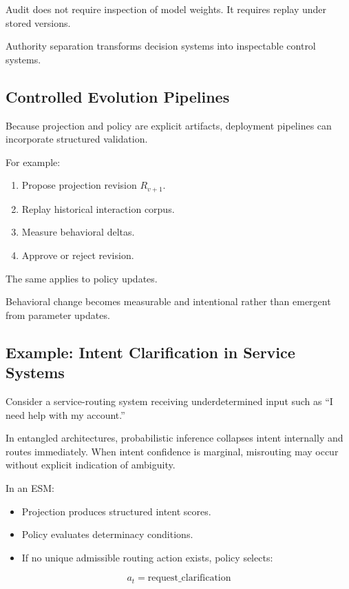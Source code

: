 \documentclass[11pt]{article}
\begin{document}
Audit does not require inspection of model weights. It requires replay under stored versions.

Authority separation transforms decision systems into inspectable control systems.


\subsection{Controlled Evolution Pipelines}

Because projection and policy are explicit artifacts, deployment pipelines can incorporate structured validation.

For example:

\begin{enumerate}
  \item Propose projection revision $R_{v+1}$.
  \item Replay historical interaction corpus.
  \item Measure behavioral deltas.
  \item Approve or reject revision.
\end{enumerate}

The same applies to policy updates.

Behavioral change becomes measurable and intentional rather than emergent from parameter updates.


\subsection{Example: Intent Clarification in Service Systems}

Consider a service-routing system receiving underdetermined input such as ``I need help with my account.''

In entangled architectures, probabilistic inference collapses intent internally and routes immediately. When intent confidence is marginal, misrouting may occur without explicit indication of ambiguity.

In an ESM:

\begin{itemize}
  \item Projection produces structured intent scores.
  \item Policy evaluates determinacy conditions.
  \item If no unique admissible routing action exists, policy selects:
\end{itemize}

\[
a_t = \text{request\_clarification}
\]
\end{document}
